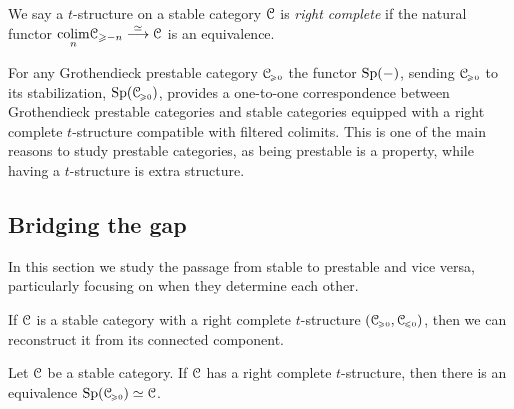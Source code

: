 \begin{definition}
    We say a $t$-structure on a stable category $\EuScript{C}$ is \emph{right complete} if the natural functor $\displaystyle {\underset{n}{\operatorname{colim}}} \EuScript{C}_{\geqslant -n} \overset{\simeq}{\longrightarrow} \EuScript{C} $ is an equivalence. 
\end{definition}

\begin{remark}
    \label{ch3:rm:grothendieck-iff-right-complete-and-colims}
    For any Grothendieck prestable category $\EuScript{C}_{\hspace{-1pt}\scriptscriptstyle\geqslant 0}$ the functor $\mathrm{Sp}(-)$, sending $\EuScript{C}_{\hspace{-1pt}\scriptscriptstyle\geqslant 0}$ to its stabilization, $\mathrm{Sp}(\EuScript{C}_{\hspace{-1pt}\scriptscriptstyle\geqslant 0})$, provides a one-to-one correspondence between Grothendieck prestable categories and stable categories equipped with a right complete $t$-structure compatible with filtered colimits. This is one of the main reasons to study prestable categories, as being prestable is a property, while having a $t$-structure is extra structure. 
\end{remark}














\subsection{Bridging the gap}

In this section we study the passage from stable to prestable and vice versa, particularly focusing on when they determine each other. 

If $\EuScript{C}$ is a stable category with a right complete $t$-structure $(\EuScript{C}_{\hspace{-1pt}\scriptscriptstyle\geqslant 0}, \EuScript{C}_{\hspace{-1pt}\scriptscriptstyle\leqslant 0})$, then we can reconstruct it from its connected component. 

\begin{lemma}
    \label{ch3:lm:right-complete-then-equiv-to-sp}
    Let $\EuScript{C}$ be a stable category. If $\EuScript{C}$ has a right complete $t$-structure, then there is an equivalence $\mathrm{Sp}(\EuScript{C}_{\hspace{-1pt}\scriptscriptstyle\geqslant 0})\simeq \EuScript{C}$. 
\end{lemma}

